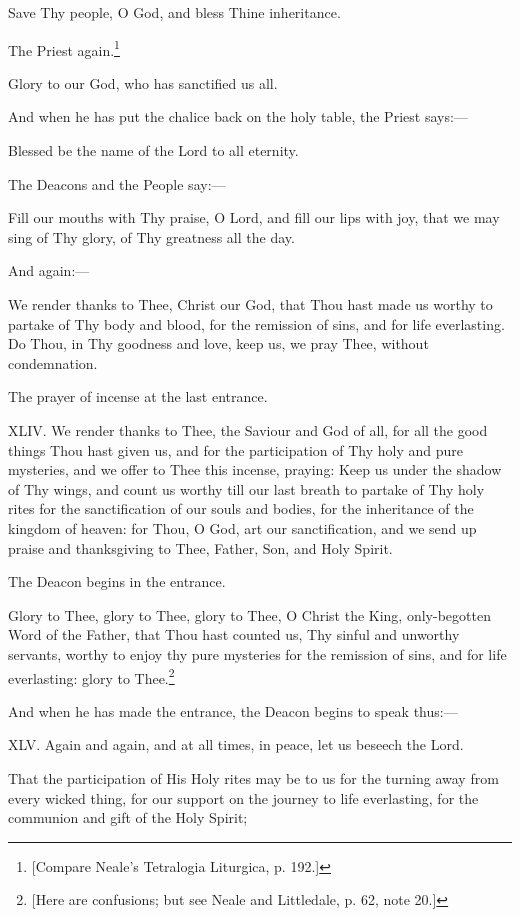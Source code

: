 Save Thy people, O God, and bless Thine inheritance.

The Priest again.\footnote{\par{}  [Compare Neale’s Tetralogia Liturgica, p. 192.]}

Glory to our God, who has sanctified us all.

And when he has put the chalice back on the holy table, the Priest says:—

Blessed be the name of the Lord to all eternity.

The Deacons and the People say:—

Fill our mouths with Thy praise, O Lord, and fill our lips with joy, that we may sing of Thy glory, of Thy greatness all the day.

And again:—

We render thanks to Thee, Christ our God, that Thou hast made us worthy to partake of Thy body and blood, for the remission of sins, and for life everlasting. Do Thou, in Thy goodness and love, keep us, we pray Thee, without condemnation.

The prayer of incense at the last entrance.

XLIV. We render thanks to Thee, the Saviour and God of all, for all the good things Thou hast given us, and for the participation of Thy holy and pure mysteries, and we offer to Thee this incense, praying: Keep us under the shadow of Thy wings, and count us worthy till our last breath to partake of Thy holy rites for the sanctification of our souls and bodies, for the inheritance of the kingdom of heaven: for Thou, O God, art our sanctification, and we send up praise and thanksgiving to Thee, Father, Son, and Holy Spirit.

The Deacon begins in the entrance.

Glory to Thee, glory to Thee, glory to Thee, O Christ the King, only-begotten Word of the Father, that Thou hast counted us, Thy sinful and unworthy servants, worthy to enjoy thy pure mysteries for the remission of sins, and for life everlasting: glory to Thee.\footnote{\par{}  [Here are confusions; but see Neale and Littledale, p. 62, note 20.]}

And when he has made the entrance, the Deacon begins to speak thus:—

XLV. Again and again, and at all times, in peace, let us beseech the Lord.

That the participation of His Holy rites may be to us for the turning away from every wicked thing, for our support on the journey to life everlasting, for the communion and gift of the Holy Spirit;

